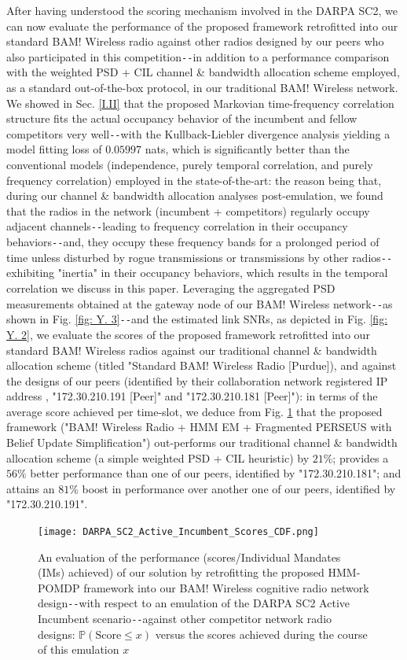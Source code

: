 \documentclass[12pt, draftcls, onecolumn]{IEEEtran}
\begin{document}
After having understood the scoring mechanism involved in the DARPA SC2, we can now evaluate the performance of the proposed framework retrofitted into our standard BAM! Wireless radio against other radios designed by our peers who also participated in this competition\texttt{-{}-}in addition to a performance comparison with the weighted PSD + CIL \cite{DARPA:CIL} channel \& bandwidth allocation scheme employed, as a standard out-of-the-box protocol, in our traditional BAM! Wireless network. We showed in Sec. \ref{I.II} that the proposed Markovian time-frequency correlation structure fits the actual occupancy behavior of the incumbent and fellow competitors very well\texttt{-{}-}with the Kullback-Liebler divergence analysis yielding a model fitting loss of $0.05997$ nats, which is significantly better than the conventional models (independence, purely temporal correlation, and purely frequency correlation) employed in the state-of-the-art: the reason being that, during our channel \& bandwidth allocation analyses post-emulation, we found that the radios in the network (incumbent + competitors) regularly occupy adjacent channels\texttt{-{}-}leading to frequency correlation in their occupancy behaviors\texttt{-{}-}and, they occupy these frequency bands for a prolonged period of time unless disturbed by rogue transmissions or transmissions by other radios\texttt{-{}-}exhibiting "inertia" in their occupancy behaviors, which results in the temporal correlation we discuss in this paper. Leveraging the aggregated PSD measurements obtained at the gateway node of our BAM! Wireless network\texttt{-{}-}as shown in Fig. \ref{fig: Y. 3}\texttt{-{}-}and the estimated link SNRs, as depicted in Fig. \ref{fig: Y. 2}, we evaluate the scores of the proposed framework retrofitted into our standard BAM! Wireless radios against our traditional channel \& bandwidth allocation scheme (titled "Standard BAM! Wireless Radio [Purdue]), and against the designs of our peers (identified by their collaboration network registered IP address \cite{DARPA:CIL}, "172.30.210.191 [Peer]" and "172.30.210.181 [Peer]"): in terms of the average score achieved per time-slot, we deduce from Fig. \ref{fig: Y. 4} that the proposed framework ("BAM! Wireless Radio + HMM EM + Fragmented PERSEUS with Belief Update Simplification") out-performs our traditional channel \& bandwidth allocation scheme (a simple weighted PSD + CIL heuristic) by $21$\%; provides a $56$\% better performance than one of our peers, identified by "172.30.210.181"; and attains an $81$\% boost in performance over another one of our peers, identified by "172.30.210.191".
\begin{figure} [htb]
    \centerline{
    \texttt{[image: DARPA\_SC2\_Active\_Incumbent\_Scores\_CDF.png]}}
    \caption{An evaluation of the performance (scores/Individual Mandates (IMs) achieved) of our solution by retrofitting the proposed HMM-POMDP framework into our BAM! Wireless cognitive radio network design\texttt{-{}-}with respect to an emulation of the DARPA SC2 Active Incumbent scenario\texttt{-{}-}against other competitor network radio designs: $\mathbb{P}(\text{Score}{\leq}x)$ versus the scores achieved during the course of this emulation $x$}
    \label{fig: Y. 4}
\end{figure}
\end{document}
